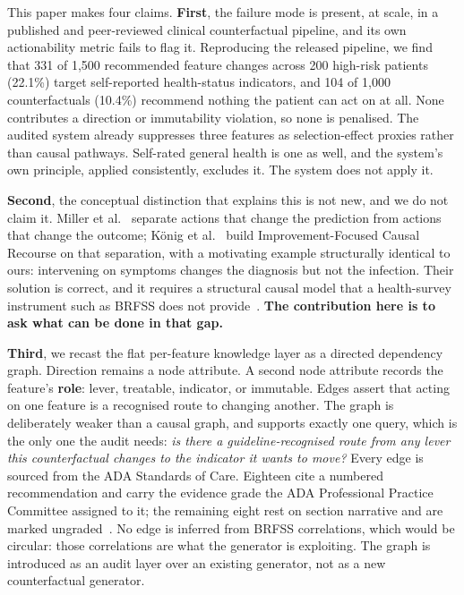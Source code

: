 \documentclass[conference]{IEEEtran}
\begin{document}
This paper makes four claims. \textbf{First}, the failure mode is present, at scale, in a published and peer-reviewed clinical counterfactual pipeline, and its own actionability metric fails to flag it. Reproducing the released pipeline, we find that 331 of 1{,}500 recommended feature changes across 200 high-risk patients (22.1\%) target self-reported health-status indicators, and 104 of 1{,}000 counterfactuals (10.4\%) recommend nothing the patient can act on at all. None contributes a direction or immutability violation, so none is penalised. The audited system already suppresses three features as selection-effect proxies rather than causal pathways. Self-rated general health is one as well, and the system's own principle, applied consistently, excludes it. The system does not apply it.

\textbf{Second}, the conceptual distinction that explains this is not new, and we do not claim it. Miller et al.~\cite{miller2020} separate actions that change the prediction from actions that change the outcome; K\"onig et al.~\cite{konig2023} build Improvement-Focused Causal Recourse on that separation, with a motivating example structurally identical to ours: intervening on symptoms changes the diagnosis but not the infection. Their solution is correct, and it requires a structural causal model that a health-survey instrument such as BRFSS does not provide~\cite{konig2023,thieu2026}. \textbf{The contribution here is to ask what can be done in that gap.}

\textbf{Third}, we recast the flat per-feature knowledge layer as a directed dependency graph. Direction remains a node attribute. A second node attribute records the feature's \textbf{role}: lever, treatable, indicator, or immutable. Edges assert that acting on one feature is a recognised route to changing another. The graph is deliberately weaker than a causal graph, and supports exactly one query, which is the only one the audit needs: \emph{is there a guideline-recognised route from any lever this counterfactual changes to the indicator it wants to move?} Every edge is sourced from the ADA Standards of Care. Eighteen cite a numbered recommendation and carry the evidence grade the ADA Professional Practice Committee assigned to it; the remaining eight rest on section narrative and are marked ungraded~\cite{ada2026s5,ada2026s8,ada2026s10,ada2026int}. No edge is inferred from BRFSS correlations, which would be circular: those correlations are what the generator is exploiting. The graph is introduced as an audit layer over an existing generator, not as a new counterfactual generator.
\end{document}
